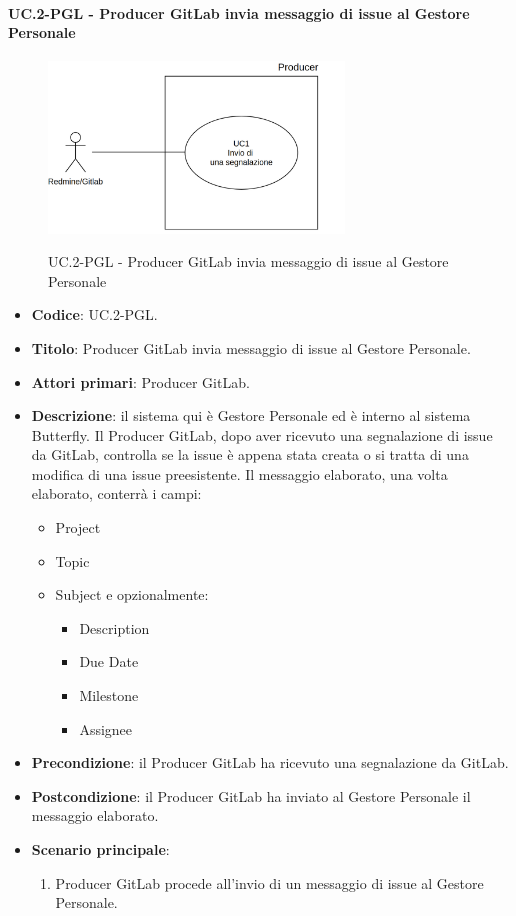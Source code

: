 	\paragraph{UC\theuccount.2-PGL -  Producer GitLab invia messaggio di issue al Gestore Personale}
	\begin{figure}[H]
		\centering
		\includegraphics[width=0.7\textwidth]{img/UC1.png}\\
		\caption{UC\theuccount.2-PGL -  Producer GitLab invia messaggio di issue al Gestore Personale}
	\end{figure}
	\begin{itemize}
		\item \textbf{Codice}: UC\theuccount.2-PGL.
		\item \textbf{Titolo}:  Producer GitLab invia messaggio di issue al Gestore Personale.
		\item \textbf{Attori primari}: Producer GitLab.
		\item \textbf{Descrizione}: il sistema qui è Gestore Personale ed è interno al sistema Butterfly. Il Producer GitLab, dopo
		aver ricevuto una segnalazione di issue da GitLab, controlla se la issue è appena stata creata o si tratta di una modifica di
		una issue preesistente. Il messaggio elaborato, una volta elaborato, conterrà i campi:
		\begin{itemize}
			\item Project
			\item Topic
			\item Subject e opzionalmente:
			\begin{itemize}
				\item Description
				\item Due Date
				\item Milestone
				\item Assignee
			\end{itemize}
		\end{itemize}
		\item \textbf{Precondizione}: il Producer GitLab ha ricevuto una segnalazione da GitLab.
		\item \textbf{Postcondizione}: il Producer GitLab ha inviato al Gestore Personale il messaggio \newline elaborato.
		\item \textbf{Scenario principale}: 
		\begin{enumerate}
			\item Producer GitLab procede all'invio di un messaggio di
			issue al Gestore Personale.
		\end{enumerate}
		
	\end{itemize}
	
